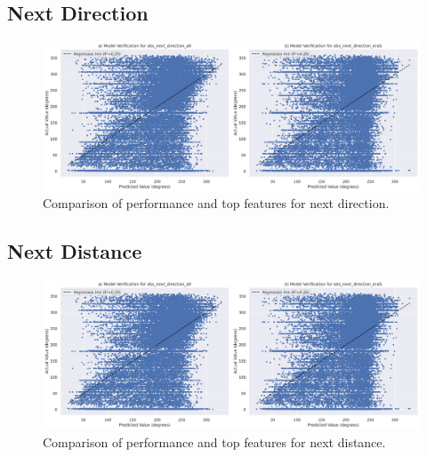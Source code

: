 \subsection{Next Direction}

\begin{figure}[ht]
    \centering
    \includegraphics[width=\textwidth]{../figures/generated/experiments/obs_next_direction/obs_next_direction_summary.png}
    \caption{Comparison of performance and top features for next direction.}
    \label{fig:obs_direction_summary}
\end{figure}

\subsection{Next Distance}

\begin{figure}[ht]
    \centering
    \includegraphics[width=\textwidth]{../figures/generated/experiments/obs_next_direction/obs_next_direction_summary.png}
    \caption{Comparison of performance and top features for next distance.}
    \label{fig:obs_distance_summary}
\end{figure}